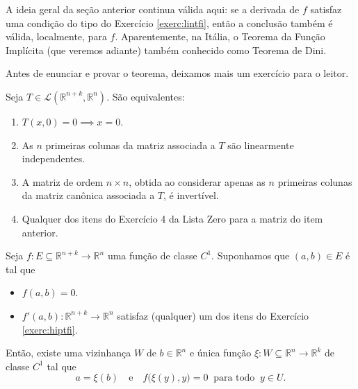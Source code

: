 A ideia geral da seção anterior continua válida aqui: se a derivada de $f$ satisfaz uma condição do tipo do Exercício \ref{exerc:lintfi}, então a conclusão também é válida, localmente, para $f$. Aparentemente, na Itália, o Teorema da Função Implícita (que veremos adiante) também conhecido como Teorema de Dini. 

Antes de enunciar e provar o teorema, deixamos mais um exercício para o leitor.

\begin{exer}\label{exerc:hiptfi}
	Seja $T \in \mathcal{L}(\mathbb{R}^{n+k}, \mathbb{R}^n)$. São equivalentes:
	\begin{enumerate}[$(i)$]
		\item $T(x,0) = 0 \implies x = 0$.
		
		\item As $n$ primeiras colunas da matriz associada a $T$ são linearmente independentes.
		
		\item A matriz de ordem $n \times n$, obtida ao considerar apenas as $n$ primeiras colunas da matriz canônica associada a $T$, é invertível.
		
		\item Qualquer dos itens do Exercício 4 da Lista Zero para a matriz do item anterior.
	\end{enumerate}
\end{exer}


\begin{teo}
	Seja $f: E \subseteq \mathbb{R}^{n+k} \to \mathbb{R}^n$ uma função de classe $C^1$. Suponhamos que $(a,b) \in E$ é tal que 
	\begin{itemize}
		\item $f(a,b) = 0$.
		\item $f'(a,b) : \mathbb{R}^{n+k} \to \mathbb{R}^n$ satisfaz (qualquer) um dos itens do Exercício \ref{exerc:hiptfi}.
	\end{itemize} Então, existe uma vizinhança $W$ de $b \in \mathbb{R}^n$ e única função $\xi: W \subseteq \mathbb{R}^{n} \to \mathbb{R}^k$ de classe $C^1$ tal que
	\[
	a = \xi(b) \quad \text{e} \quad f\big( \xi(y), y \big) = 0 \ \text{ para todo } \ y \in U.
	\]
\end{teo}

